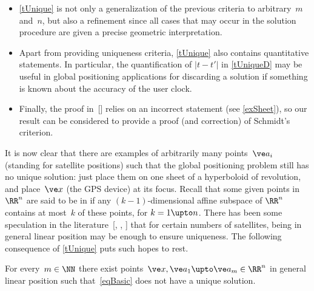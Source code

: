 \documentclass[reqno]{amsart}
\begin{document}
\begin{rem}
\begin{itemize}
  \item \cref{tUnique} is not only a generalization of the previous
    criteria to arbitrary~$m$ and~$n$, but also a refinement since all
    cases that may occur in the solution procedure are given a precise
    geometric interpretation.
  \item Apart from providing uniqueness criteria, \cref{tUnique} also contains
    quantitative statements. In particular, the quantification of
    $|t - t'|$ in \cref{tUniqueD} may be useful in global positioning applications
    for discarding a solution if something is known about the accuracy
    of the user clock. 
  \item Finally, the proof in~[] relies on an incorrect statement (see \cref{exSheet}), so our result can be considered to provide a proof (and correction) of Schmidt's criterion. \remend
  \end{itemize}
  \renewcommand{\remend}{}
\end{rem}

It is now clear that there are examples of arbitrarily many points~$\ve a_i$ (standing for satellite positions) such that the global positioning problem still has no unique
solution: just place them on one sheet of a hyperboloid of revolution,
and place~$\ve x$ (the GPS device) at its focus. Recall that some
given points in $\RR^n$ are said to be in 
if any $(k-1)$-dimensional affine subspace of $\RR^n$ contains at
most~$k$ of these points, for $k = 1 \upto n$. There has been some
speculation in the literature~[,
, ] that for certain numbers of satellites, being
in general linear position may be enough to ensure uniqueness. The
following consequence of \cref{tUnique} puts such hopes to rest.

\begin{cor} \label{cUnique}%
  For every~$m \in \NN$ there exist
  points~$\ve x, \ve a_1 \upto \ve a_m \in \RR^n$ in general linear
  position such that~\eqref{eqBasic} does not have a unique solution.
\end{cor}
\end{document}
